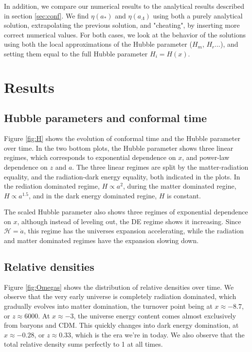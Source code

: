 \documentclass[10pt, a4paper]{article}
\begin{document}
In addition, we compare our numerical results to the analytical results described in section \ref{sec:conf}. We find $\eta(a_*)$ and $\eta(a_\Lambda)$ using both a purely analytical solution, extrapolating the previous solution, and "cheating", by inserting more correct numerical values. For both cases, we look at the behavior of the solutions using both the local approximations of the Hubble parameter ($H_m$, $H_r$...), and setting them equal to the full Hubble parameter $H_i = H(x)$.


\section{Results}
\subsection{Hubble parameters and conformal time}
Figure \ref{fig:H} shows the evolution of conformal time and the Hubble parameter over time. In the two bottom plots, the Hubble parameter shows three linear regimes, which corresponds to exponential dependence on $x$, and power-law dependence on $z$ and $a$. The three linear regimes are split by the matter-radiation equality, and the radiation-dark energy equality, both indicated in the plots. In the rediation dominated regime, $H \propto a^2$, during the matter dominated regine, $H \propto a^{1.5}$, and in the dark energy dominated regine, $H$ is constant.

The scaled Hubble parameter also shows three regimes of exponential dependence on $x$, although instead of leveling out, the DE regime shows it increasing. Since $\mathcal{H} = \dot{a}$, this regime has the universes expansion accelerating, while the radiation and matter dominated regimes have the expansion slowing down.

\subsection{Relative densities}
Figure \ref{fig:Omegas} shows the distribution of relative densities over time. We observe that the very early universe is completely radiation dominated, which gradually evolves into matter domination, the turnover point being at $x\approx-8.7$, or $z\approx 6000$. At $x\approx-3$, the universe energy content comes almost exclusively from baryons and CDM. This quickly changes into dark energy domination, at $x\approx -0.28$, or $z\approx 0.33$, which is the era we're in today. We also observe that the total relative density sums perfectly to 1 at all times.
\end{document}
